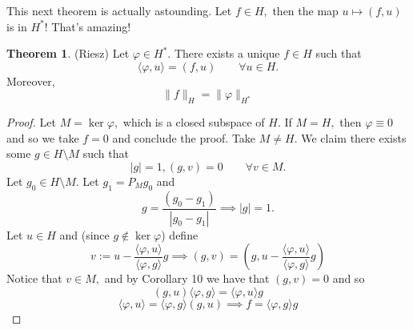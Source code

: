 \documentclass[10pt, oneside]{article}
\theoremstyle{definition}
\newtheorem{thm}{Theorem}
\begin{document}
This next theorem is actually astounding. Let $f\in H,$ then the map $u \mapsto (f,u)$ is in $H^*$! That's amazing!
\begin{thm}
    (Riesz) Let $\varphi \in H^*.$ There exists a unique $f\in H$ such that 
    \[\langle \varphi, u\rangle = (f, u) \qquad \forall u \in H.\] Moreover, 
    \[\|f\|_{H} = \|\varphi\|_{H^*}\]
\end{thm}
\begin{proof}
    Let $M = \ker \varphi,$ which is a closed subspace of $H.$ If $M = H,$ then $\varphi \equiv  0$ and so we take $f = 0$ and conclude the proof. Take $M \neq H.$ We claim there exists some $g\in H\setminus M$ such that 
    \[|g| = 1, (g,v) = 0 \qquad \forall v\in M.\] Let $g_0 \in H\setminus M.$ Let $g_1 = P_Mg_0$ and 
    \[g = \frac{(g_0 - g_1)}{|g_0 - g_1|} \implies |g| = 1.\] Let $u\in H$ and (since $g \notin \ker \varphi$) define 
    \[v := u - \frac{\langle \varphi, u\rangle}{\langle\varphi, g\rangle}g \implies (g, v) = (g, u-\frac{\langle \varphi, u\rangle}{\langle\varphi, g\rangle}g)\] Notice that $v\in M,$ and by Corollary 10 we have that $(g,v) = 0$ and so  
    \[(g,u) \langle \varphi, g\rangle = \langle \varphi, u\rangle g\]
    \[\langle \varphi, u\rangle = \langle\varphi, g\rangle (g,u) \implies f = \langle \varphi, g\rangle g\]
\end{proof}

\newpage
\end{document}
